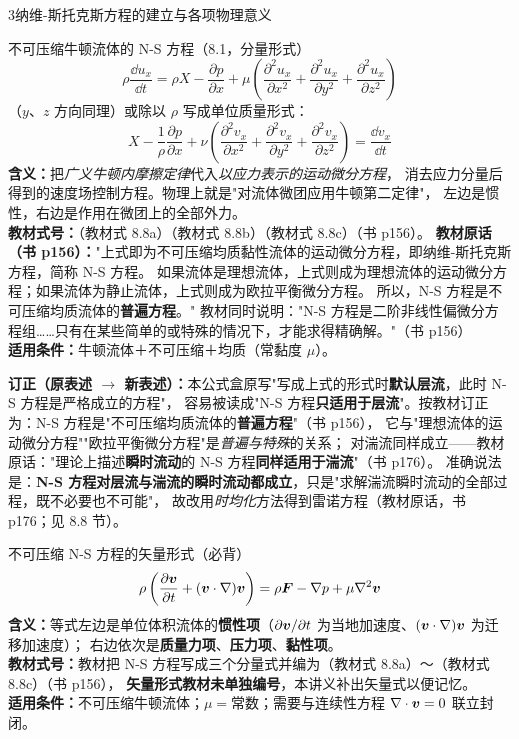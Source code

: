 \begin{kaodian}{3}{纳维-斯托克斯方程的建立与各项物理意义}
\begin{gongshi}{不可压缩牛顿流体的 N-S 方程（8.1，分量形式）}
\[ \rho\frac{\dd u_x}{\dd t}=\rho X-\frac{\partial p}{\partial x}+\mu\left(\frac{\partial^2 u_x}{\partial x^2}+\frac{\partial^2 u_x}{\partial y^2}+\frac{\partial^2 u_x}{\partial z^2}\right) \]
（$y$、$z$ 方向同理）或除以 $\rho$ 写成单位质量形式：
\[ X-\frac{1}{\rho}\frac{\partial p}{\partial x}+\nu\left(\frac{\partial^2 v_x}{\partial x^2}+\frac{\partial^2 v_x}{\partial y^2}+\frac{\partial^2 v_x}{\partial z^2}\right)=\frac{\dd v_x}{\dd t} \]
\textbf{含义：}把\emph{广义牛顿内摩擦定律}代入\emph{以应力表示的运动微分方程}，
消去应力分量后得到的速度场控制方程。物理上就是"对流体微团应用牛顿第二定律"，
左边是惯性，右边是作用在微团上的全部外力。\\
\textbf{教材式号：}（教材式 8.8a）（教材式 8.8b）（教材式 8.8c）（书 p156）。
\textbf{教材原话（书 p156）：}"上式即为不可压缩均质黏性流体的运动微分方程，即纳维-斯托克斯方程，简称 N-S 方程。
如果流体是理想流体，上式则成为理想流体的运动微分方程；如果流体为静止流体，上式则成为欧拉平衡微分方程。
所以，N-S 方程是不可压缩均质流体的\textbf{普遍方程}。"
教材同时说明："N-S 方程是二阶非线性偏微分方程组……只有在某些简单的或特殊的情况下，才能求得精确解。"（书 p156）\\
\textbf{适用条件：}牛顿流体＋不可压缩＋均质（常黏度 $\mu$）。
\end{gongshi}

\begin{tishi}
\textbf{订正（原表述 $\to$ 新表述）：}本公式盒原写"写成上式的形式时\textbf{默认层流}，此时 N-S 方程是严格成立的方程"，
容易被读成"N-S 方程\textbf{只适用于层流}"。按教材订正为：N-S 方程是"不可压缩均质流体的\textbf{普遍方程}"（书 p156），
它与"理想流体的运动微分方程""欧拉平衡微分方程"是\emph{普遍与特殊}的关系；
对湍流同样成立——教材原话："理论上描述\textbf{瞬时流动}的 N-S 方程\textbf{同样适用于湍流}"（书 p176）。
准确说法是：\textbf{N-S 方程对层流与湍流的瞬时流动都成立}，只是"求解湍流瞬时流动的全部过程，既不必要也不可能"，
故改用\emph{时均化}方法得到雷诺方程（教材原话，书 p176；见 8.8 节）。
\end{tishi}

\begin{gongshi}{不可压缩 N-S 方程的矢量形式（必背）}
\[ \rho\left(\frac{\partial \bm{v}}{\partial t}+(\bm{v}\cdot\nabla)\bm{v}\right)=\rho\bm{F}-\nabla p+\mu\nabla^2\bm{v} \]
\textbf{含义：}等式左边是单位体积流体的\textbf{惯性项}（$\partial\bm{v}/\partial t$ 为当地加速度、$(\bm{v}\cdot\nabla)\bm{v}$ 为迁移加速度）；
右边依次是\textbf{质量力项}、\textbf{压力项}、\textbf{黏性项}。\\
\textbf{教材式号：}教材把 N-S 方程写成三个分量式并编为（教材式 8.8a）～（教材式 8.8c）（书 p156），
\textbf{矢量形式教材未单独编号}，本讲义补出矢量式以便记忆。\\
\textbf{适用条件：}不可压缩牛顿流体；$\mu=$常数；需要与连续性方程 $\nabla\cdot\bm{v}=0$ 联立封闭。
\end{gongshi}


\end{kaodian}
